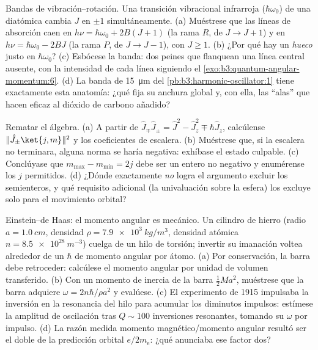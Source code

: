 \begin{exercise}[$\star\star\star$]\label{exo:b3:quantum-angular-momentum:10}
Bandas de vibración--rotación. Una transición vibracional infrarroja
($\hbar\omega_0$) de una diatómica cambia $J$ en $\pm1$
simultáneamente. (a) Muéstrese que las líneas de absorción caen en $h\nu =
\hbar\omega_0 + 2B(J+1)$ (la rama $R$, de $J \to J+1$) y en
$h\nu = \hbar\omega_0 - 2BJ$ (la rama $P$, de $J \to J-1$), con $J \ge
1$. (b) ¿Por qué hay un \emph{hueco} justo en $\hbar\omega_0$? (c)
Esbócese la banda: dos peines que flanquean una línea central ausente, con la
intensidad de cada línea siguiendo el
\cref{exo:b3:quantum-angular-momentum:6}. (d) La banda de
\qty{15}{\micro m} del \cref{pb:b3:harmonic-oscillator:1} tiene
exactamente esta anatomía: ¿qué fija su anchura global y, con ella, las
``alas'' que hacen eficaz al dióxido de carbono añadido?
\end{exercise}

\begin{exercise}[$\star\star\star$]\label{exo:b3:quantum-angular-momentum:11}
Rematar el álgebra. (a) A partir de $\hat J_\mp\hat J_\pm = \hat J^2 -
\hat J_z^2 \mp \hbar\hat J_z$, calcúlense $\|\hat J_\pm\ket{j,m}\|^2$
y los coeficientes de escalera. (b) Muéstrese que, si la escalera no
terminara, alguna norma se haría negativa: exhíbase el estado culpable.
(c) Conclúyase que $m_{\max} - m_{\min} = 2j$ debe ser un entero no negativo
y enumérense los $j$ permitidos. (d) ¿Dónde exactamente \emph{no} logra el
argumento excluir los semienteros, y qué requisito adicional (la
univaluación sobre la esfera) los excluye solo para el movimiento orbital?
\end{exercise}

\begin{exercise}[$\star\star\star$]\label{exo:b3:quantum-angular-momentum:12}
Einstein--de Haas: el momento angular es mecánico. Un cilindro de hierro
(radio $a = \qty{1.0}{cm}$, densidad $\rho = \qty{7.9e3}{kg/m^3}$,
densidad atómica $n = \qty{8.5e28}{m^{-3}}$) cuelga de un hilo de torsión; invertir
su imanación voltea alrededor de un $\hbar$ de momento angular por
átomo. (a) Por conservación, la barra debe retroceder: calcúlese el momento
angular por unidad de volumen transferido. (b) Con un momento de inercia de la barra $\tfrac12 M
a^2$, muéstrese que la barra adquiere $\omega = 2n\hbar/\rho a^2$ y
evalúese. (c) El experimento de 1915 impulsaba la inversión en la
resonancia del hilo para acumular los diminutos impulsos: estímese la
amplitud de oscilación tras $Q \sim 100$ inversiones resonantes, tomando su
$\omega$ por impulso. (d) La razón medida momento magnético/momento angular
resultó ser el doble de la predicción orbital $e/2m_{\text{e}}$: ¿qué
anunciaba ese factor dos?
\end{exercise}

